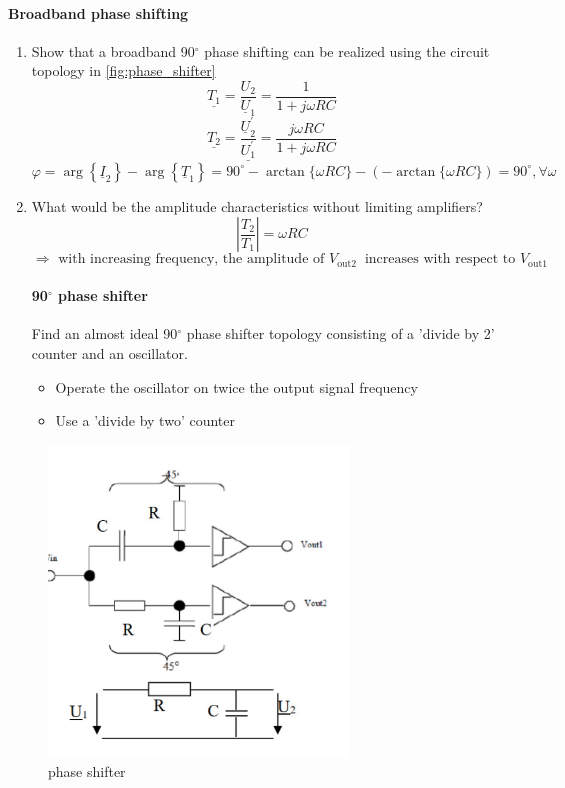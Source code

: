\paragraph{Broadband phase shifting}
\begin{enumerate}
    \item Show that a broadband 90$^{\circ}$ phase shifting can be realized using the circuit topology in \autoref{fig:phase_shifter}
    $$
    \underline{T_1}=\frac{U_2}{\underline{U}_1}=\frac{1}{1+j \omega R C}
    $$
    $$
    \underline{T_2}=\frac{\underline{U}_2^{\prime}}{\underline{U_1^{\prime}}}=\frac{j \omega R C}{1+j \omega R C}
    $$
    $$
    \varphi=\arg \left\{\underline{I}_2\right\}-\arg \left\{\underline{T}_1\right\}=90^{\circ}-\arctan \{\omega R C\}-(-\arctan \{\omega R C\})=90^{\circ}, \forall \omega
    $$
    \item What would be the amplitude characteristics without limiting amplifiers?
    $$
    \left|\frac{T_2}{T_1}\right|=\omega R C
    $$
    $$
    \Rightarrow \text { with increasing frequency, the amplitude of } V_{\text {out2 }} \text { increases with respect to } V_{\text {out1 }}
    $$
\paragraph{90$^{\circ}$ phase shifter}
Find an almost ideal 90$^{\circ}$ phase shifter topology consisting of a 'divide by 2' counter and an
oscillator.\newline
\begin{itemize}
    \item Operate the oscillator on twice the output signal frequency
    \item Use a 'divide by two' counter
\end{itemize}
\end{enumerate}
\begin{figure}[ht]
  \centering
  \includegraphics[width=8cm]{images/phase_shifter.jpg}
  \caption{phase shifter}
  \label{fig:phase_shifter}
\end{figure}
